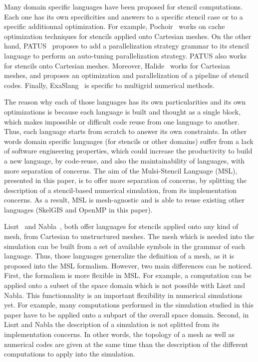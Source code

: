 Many domain specific languages have been proposed for stencil computations. Each one has its own specificities and answers to a specific stencil case or to a specific additionnal optimization. For example, Pochoir~\cite{spaaTangCKLL11} works on cache optimization techniques for stencils applied onto Cartesian meshes. On the other hand, PATUS~\cite{citeulike12258902} proposes to add a parallelization strategy grammar to its stencil language to perform an auto-tuning parallelization strategy. PATUS also works for stencils onto Cartesian meshes. Moreover, Halide~\cite{Ragan-Kelley:2013:HLC:2491956.2462176} works for Cartesian meshes, and proposes an optimization and parallelization of a pipeline of stencil codes. Finally, ExaSlang~\cite{Schmitt:2014:EDL:2691166.2691171} is specific to multigrid numerical methods.

The reason why each of those languages has its own particularities and its own optimizations is because each language is built and thought as a single block, which makes impossible or difficult code reuse from one language to another. Thus, each language starts from scratch to answer its own constraints. In other words domain specific languages (for stencils or other domains) suffer from a lack of software engineering properties, which could increase the productivity to build a new language, by code-reuse, and also the maintainability of languages, with more separation of concerns. The aim of the Mulsi-Stencil Language (MSL), presented in this paper, is to offer more separation of concerns, by splitting the description of a stencil-based numerical simulation, from its implementation concerns. As a result, MSL is mesh-agnostic and is able to reuse existing other languages (SkelGIS and OpenMP in this paper). 

Liszt~\cite{DeVito:2011:LDS:2063384.2063396} and Nabla~\cite{Camier:2015:IPP:2820083.2820107}, both offer languages for stencils applied onto any kind of mesh, from Cartesian to unstructured meshes. The mesh which is needed into the simulation can be built from a set of available symbols in the grammar of each language. Thus, those languages generalize the definition of a mesh, as it is proposed into the MSL formalism. 
However, two main differences can be noticed. First, the formalism is more flexible in MSL. For example, a computation can be applied onto a subset of the space domain which is not possible with Liszt and Nabla. This functionnality is an important flexibility in numerical simulations yet. For example, many computations performed in the simulation studied in this paper have to be applied onto a subpart of the overall space domain.
Second, in Liszt and Nabla the description of a simulation is not splitted from its implementation concerns. In other words, the topology of a mesh as well as numerical codes are given at the same time than the description of the different computations to apply into the simulation. 

